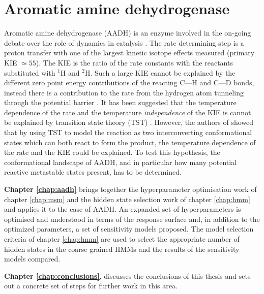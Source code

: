 \section{Aromatic amine dehydrogenase}
Aromatic amine dehydrogenase (AADH) is an enzyme involved in the on-going debate over the role of dynamics in catalysis \cite{glowackiTakingOckhamRazor2012b,glowackiProteinDynamicsEnzyme2012a,mcgeaghProteinDynamicsEnzyme2011}. The rate determining step is a proton transfer with one of the largest kinetic isotope effects measured (primary KIE $\simeq 55$)\cite{masgrauTunnelingClassicalPaths2007}. The KIE is the ratio of the rate constants with the reactants substituted with $^1$H and $^{2}$H. Such a large KIE cannot be explained by the different zero point energy contributions of the reacting C---H and C---D bonds, instead there is a contribution to the rate from the hydrogen atom tunneling through the potential barrier \cite{masgrauTunnelingClassicalPaths2007,antoniouLargeKineticIsotope1997} \cite{basranImportanceBarrierShape2001a,sutcliffeHydrogenTunnellingEnzymecatalysed2006}. It has been suggested that the temperature dependence of the rate and the temperature \emph{independence} of the KIE is cannot be explained by transition state theory (TST) \cite{agrawalVibrationallyEnhancedHydrogen2004,kohenEnzymeCatalysisClassical1998}. However, the authors of \cite{glowackiProteinDynamicsEnzyme2012a} showed that by using TST to model the reaction as two interconverting conformational states which can both react to form the product, the temperature dependence of the rate and the KIE could be explained. To test this hypothesis, the conformational landscape of AADH, and in particular how many potential reactive metastable states present, has to be determined. 

\textbf{Chapter \ref{chap:aadh}} brings together the hyperparameter optimisation work of chapter  \ref{chap:msm} and the hidden state selection work of chapter \ref{chap:hmm} and applies it to the case of AADH. An expanded set of hyperparameters is optimised and understood in terms of the response surface and, in addition to the optimized parameters, a set of sensitivity models proposed. The model selection criteria of chapter \ref{chap:hmm} are used to select the appropriate number of hidden states in the coarse grained HMMs and the results of the sensitivity models compared. 

\textbf{Chapter \ref{chap:conclusions}}, discusses the conclusions of this thesis and sets out a concrete set of steps for further work in this area. 


